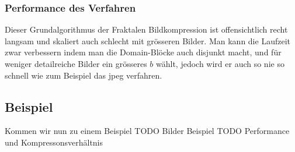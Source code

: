 \subsubsection{Performance des Verfahren}
Dieser Grundalgorithmus der Fraktalen Bildkompression ist offensichtlich recht langsam und skaliert auch schlecht mit grösseren Bilder.
Man kann die Laufzeit zwar verbessern indem man die Domain-Blöcke auch disjunkt macht, und für weniger detailreiche Bilder ein grösseres $b$ wählt, jedoch wird er auch so nie so schnell wie zum Beispiel das jpeg verfahren.

\subsection{Beispiel}
Kommen wir nun zu einem Beispiel
TODO Bilder Beispiel
TODO Performance und Kompressonsverhältnis
